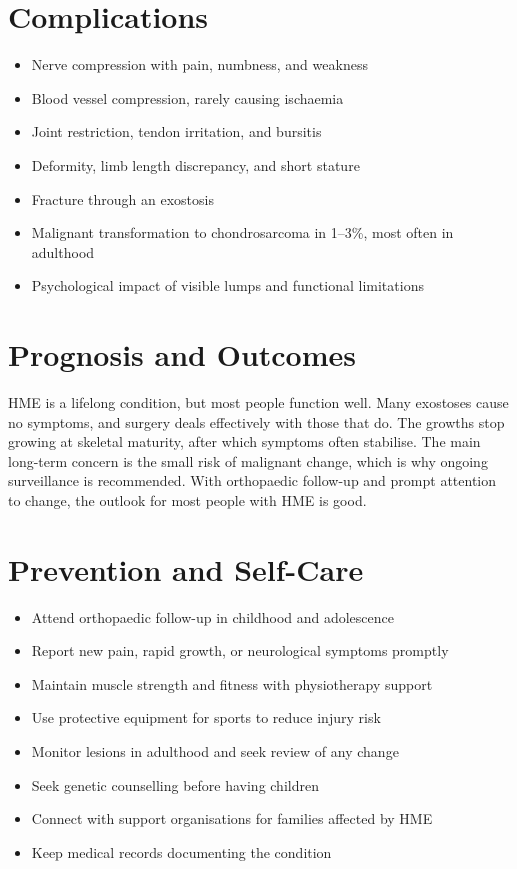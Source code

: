 \section*{Complications}
\begin{itemize}
    \item Nerve compression with pain, numbness, and weakness
    \item Blood vessel compression, rarely causing ischaemia
    \item Joint restriction, tendon irritation, and bursitis
    \item Deformity, limb length discrepancy, and short stature
    \item Fracture through an exostosis
    \item Malignant transformation to chondrosarcoma in 1--3\%, most often in adulthood
    \item Psychological impact of visible lumps and functional limitations
\end{itemize}

\section*{Prognosis and Outcomes}
HME is a lifelong condition, but most people function well. Many exostoses cause no symptoms, and surgery deals effectively with those that do. The growths stop growing at skeletal maturity, after which symptoms often stabilise. The main long-term concern is the small risk of malignant change, which is why ongoing surveillance is recommended. With orthopaedic follow-up and prompt attention to change, the outlook for most people with HME is good.

\section*{Prevention and Self-Care}
\begin{itemize}
    \item Attend orthopaedic follow-up in childhood and adolescence
    \item Report new pain, rapid growth, or neurological symptoms promptly
    \item Maintain muscle strength and fitness with physiotherapy support
    \item Use protective equipment for sports to reduce injury risk
    \item Monitor lesions in adulthood and seek review of any change
    \item Seek genetic counselling before having children
    \item Connect with support organisations for families affected by HME
    \item Keep medical records documenting the condition
\end{itemize}

